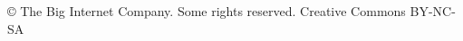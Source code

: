 \usepackage{cclicenses}

\beamertemplatenavigationsymbolsempty

{%
\begin{beamercolorbox}{}
  \hspace{8pt} \copyright \hspace{0in} The Big Internet Company. Some rights reserved. \cc \hspace{-0.1in} Creative Commons BY-NC-SA
  \vspace{8pt}
\end{beamercolorbox}%
}
